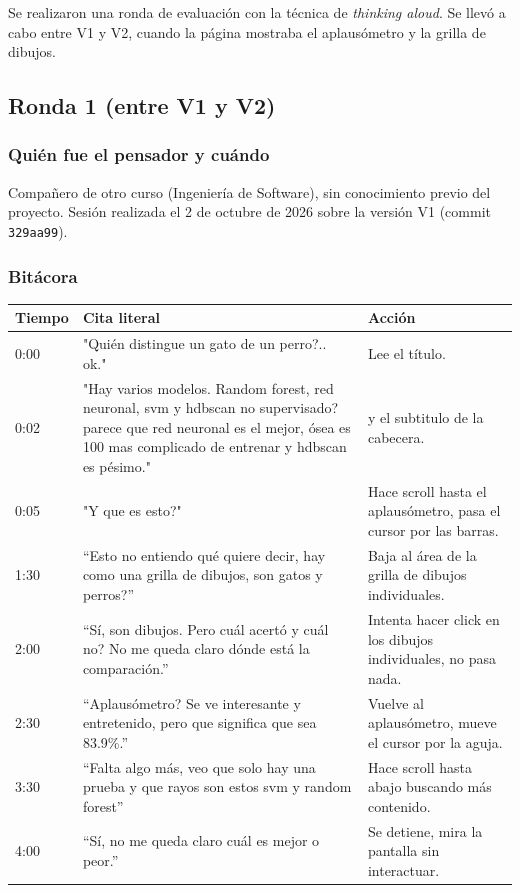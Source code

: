 \documentclass{article}
\begin{document}
Se realizaron una ronda de evaluaci\'{o}n con la t\'{e}cnica de \textit{thinking aloud}. Se llev\'{o} a cabo entre V1 y V2, cuando la p\'{a}gina mostraba el
aplaus\'{o}metro y la grilla de dibujos.

\subsection{Ronda 1 (entre V1 y V2)}

\subsubsection{Qui\'{e}n fue el pensador y cu\'{a}ndo}

Compa\~{n}ero de otro curso (Ingenier\'{i}a de Software), sin conocimiento previo del proyecto.
Sesi\'{o}n realizada el 2 de octubre de 2026 sobre la versi\'{o}n V1 (commit \texttt{329aa99}).

\subsubsection{Bit\'{a}cora}

\begin{longtable}{p{1.8cm} p{5.5cm} p{5.5cm}}
  \toprule
  \textbf{Tiempo} & \textbf{Cita literal} & \textbf{Acci\'{o}n} \\
  \midrule
  \endhead
  0:00 & "Quién distingue un gato de un perro?.. ok." & Lee el t\'{i}tulo. \\
  \midrule
  0:02 & "Hay varios modelos. Random forest, red neuronal, svm y hdbscan no supervisado? parece que red neuronal es el mejor, ósea es 100 mas complicado de entrenar y hdbscan es pésimo." & y el subtitulo de la cabecera. \\
  \midrule
  0:05 & "Y que es esto?" & Hace scroll hasta el aplaus\'{o}metro, pasa el cursor por las barras. \\
  \midrule
  1:30 & ``Esto no entiendo qu\'{e} quiere decir, hay como una grilla de dibujos, son gatos y perros?'' & Baja al \'{a}rea de la grilla de dibujos individuales. \\
  \midrule
  2:00 & ``S\'{i}, son dibujos. Pero cu\'{a}l acert\'{o} y cu\'{a}l no? No me queda claro d\'{o}nde est\'{a} la comparaci\'{o}n.'' & Intenta hacer click en los dibujos individuales, no pasa nada. \\
  \midrule
  2:30 & ``Aplausómetro? Se ve interesante y entretenido, pero que significa que sea 83.9\%.'' & Vuelve al aplaus\'{o}metro, mueve el cursor por la aguja. \\
  \midrule
  3:30 & ``Falta algo m\'{a}s, veo que solo hay una prueba y que rayos son estos svm y random forest'' & Hace scroll hasta abajo buscando m\'{a}s contenido. \\
  \midrule
  4:00 & ``S\'{i}, no me queda claro cu\'{a}l es mejor o peor.'' & Se detiene, mira la pantalla sin interactuar. \\
  \bottomrule
\end{longtable}
\end{document}
